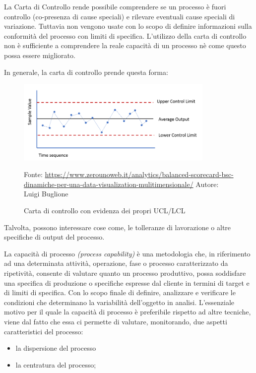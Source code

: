 La Carta di Controllo rende possibile comprendere se un processo è fuori controllo (co-presenza di cause speciali) e rilevare eventuali cause speciali di variazione. 
Tuttavia non vengono usate con lo scopo di definire informazioni sulla conformità del processo con limiti di specifica.
L'utilizzo della carta di controllo non è sufficiente a comprendere la reale capacità di un processo nè come questo possa essere migliorato.

In generale, la carta di controllo prende questa forma:
\begin{figure}[h]
  \centering
  \includegraphics[width=0.85\textwidth]{img/controlchart.png}
  \caption{Carta di controllo con evidenza dei propri UCL/LCL} 
  {Fonte: \url{https://www.zerounoweb.it/analytics/balanced-scorecard-bsc-dinamiche-per-una-data-visualization-mulitimensionale/} Autore: Luigi Buglione}
  \label{fig:controlchart.png}
\end{figure}


Talvolta, possono interessare cose come, le tolleranze di lavorazione o altre specifiche di output del processo. 

La capacità di processo \textit{(process capability)} è una metodologia che, in riferimento ad una determinata attività, operazione, fase o processo caratterizzato da ripetività, consente di valutare quanto un processo produttivo, possa soddisfare una specifica di produzione o specifiche espresse dal cliente in termini di target e di limiti di specifica.
Con lo scopo finale di definire, analizzare e verificare le condizioni che determinano la variabilità dell'oggetto in analisi.
L'essenziale motivo per il quale la capacità di processo è preferibile rispetto ad altre tecniche, viene dal fatto che essa ci permette di valutare, monitorando, due aspetti caratteristici del processo:
\begin{itemize}
  \item la dispersione del processo
  \item la centratura del processo;
  \end{itemize}


